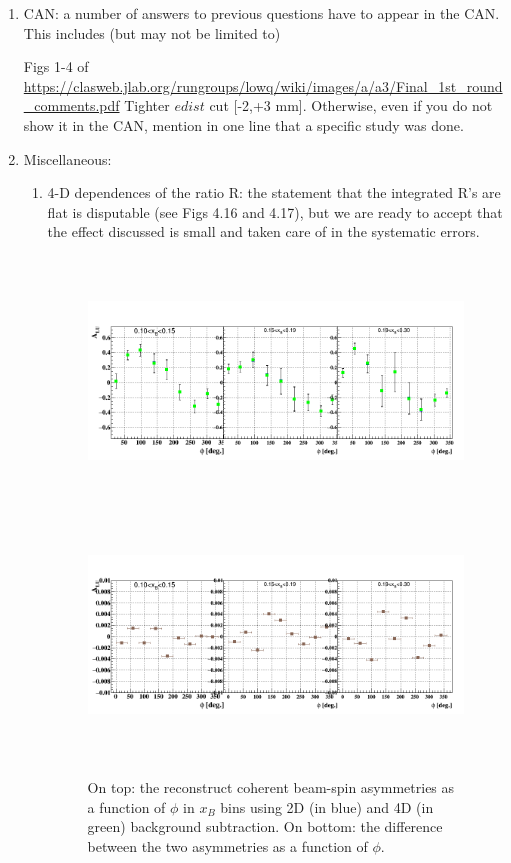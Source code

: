 \begin{enumerate}
\item CAN: a number of answers to previous questions have to appear in the CAN.  
This includes (but may not be limited to) 

Figs 1-4 of \url{https://clasweb.jlab.org/rungroups/lowq/wiki/images/a/a3/Final_1st_round_comments.pdf} 
Tighter $edist$ cut [-2,+3 mm].
Otherwise, even if you do not show it in the CAN, mention in one line that a 
specific study was done.
\item Miscellaneous:
   \begin{enumerate}
      \item 4-D dependences of the ratio R: the statement that the integrated R's 
    are flat is disputable (see Figs 4.16 and 4.17), but we are ready to accept 
    that the effect discussed is small and taken care of in the systematic 
    errors.
    \begin{figure}[tbp]
    \includegraphics[height=6.6cm]{fig/BSA_Coherent_xB.png}
    \includegraphics[height=6.6cm]{fig/diff_BSA_Coherent_xB.png}
    \caption{On top: the reconstruct coherent beam-spin asymmetries as a 
    function of $\phi$ in $x_{B}$ bins using 2D (in blue) and 4D (in green) 
 background subtraction.  On bottom: the difference between the two asymmetries 
 as a function of $\phi$.}
    \label{fig:coh_binning}
    \end{figure}            


\end{enumerate}
\end{enumerate}
